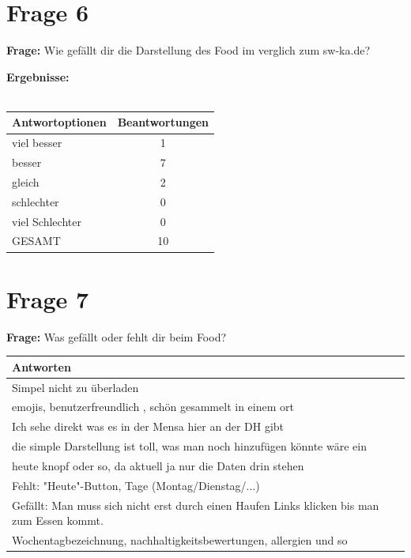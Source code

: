 \section{Frage 6 \label{frage06}}
\textbf{Frage:} Wie gefällt dir die Darstellung des Food im verglich zum sw-ka.de?
\begin{figure}
	\centering
\end{figure}
\textbf{Ergebnisse:}\\
\\
\begin{tabular}{|l|c|}\hline
	\textbf{Antwortoptionen} & \textbf{Beantwortungen} \\\hline
	viel besser  	& 1 \\\hline
	besser			& 7 \\\hline
	gleich 			& 2 \\\hline
	schlechter 		& 0 \\\hline
	viel Schlechter	& 0 \\\hline
	GESAMT			& 10 \\\hline			
\end{tabular}

\section{Frage 7 \label{frage07}}
\textbf{Frage:} Was gefällt oder fehlt dir beim Food?\\
\begin{tabular}{|l|}\hline
	\textbf{Antworten} \\\hline
	Simpel nicht zu überladen  \\\hline
	emojis, benutzerfreundlich , schön gesammelt in einem ort \\\hline
	Ich sehe direkt was es in der Mensa hier an der DH gibt \\\hline
	die simple Darstellung ist toll, was man noch hinzufügen könnte wäre ein\\
	heute knopf oder so, da aktuell ja nur die Daten drin stehen 
	\\\hline
	Fehlt: "Heute"-Button, Tage (Montag/Dienstag/...)\\
	Gefällt: Man muss sich nicht erst durch einen Haufen Links klicken bis man zum Essen kommt. \\\hline
	Wochentagbezeichnung, nachhaltigkeitsbewertungen, allergien und so \\\hline			
\end{tabular}

